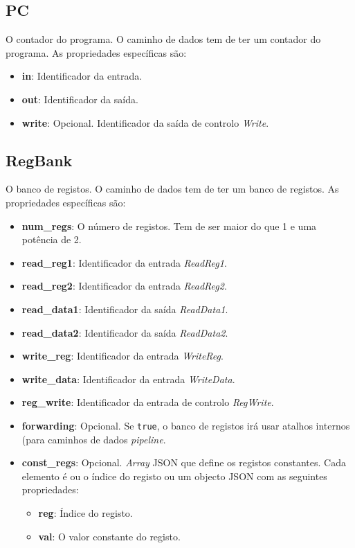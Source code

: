 \documentclass[11pt,a4paper,twoside,titlepage]{report}
\begin{document}
\subsection{PC}

O contador do programa. O caminho de dados tem de ter um contador do programa.
As propriedades específicas são:
\begin{itemize}
	\item \textbf{in}: Identificador da entrada.
	\item \textbf{out}: Identificador da saída.
	\item \textbf{write}: Opcional. Identificador da saída de controlo \emph{Write}.
\end{itemize}

\subsection{RegBank}

O banco de registos. O caminho de dados tem de ter um banco de registos.
As propriedades específicas são:
\begin{itemize}
	\item \textbf{num\_regs}: O número de registos. Tem de ser maior do que 1 e
		uma potência de 2.
	\item \textbf{read\_reg1}: Identificador da entrada \emph{ReadReg1}.
	\item \textbf{read\_reg2}: Identificador da entrada \emph{ReadReg2}.
	\item \textbf{read\_data1}: Identificador da saída \emph{ReadData1}.
	\item \textbf{read\_data2}: Identificador da saída \emph{ReadData2}.
	\item \textbf{write\_reg}: Identificador da entrada \emph{WriteReg}.
	\item \textbf{write\_data}: Identificador da entrada \emph{WriteData}.
	\item \textbf{reg\_write}: Identificador da entrada de controlo \emph{RegWrite}.
	\item \textbf{forwarding}: Opcional. Se \verb+true+, o banco de registos irá
		usar atalhos internos (para caminhos de dados \emph{pipeline}.
	\item \textbf{const\_regs}: Opcional. \emph{Array} JSON que define os registos
		constantes. Cada elemento é ou o índice do registo ou um objecto JSON com
		as seguintes propriedades:
		\begin{itemize}
			\item \textbf{reg}: Índice do registo.
			\item \textbf{val}: O valor constante do registo.
		\end{itemize}
\end{itemize}
\end{document}
